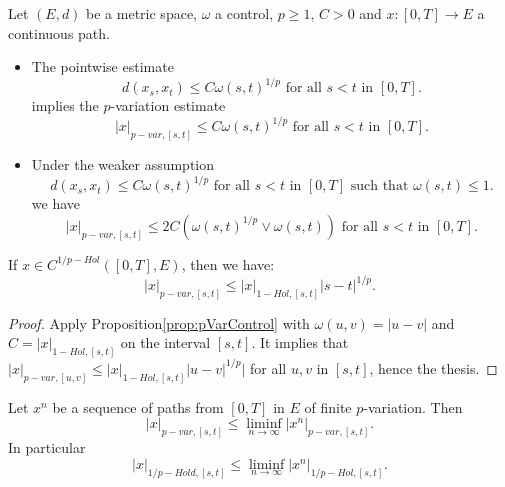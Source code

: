 \begin{proposition}\label{prop:pVarControl}
    Let $(E,d)$ be a metric space, $\omega$ a control, $p \geq 1$, $C>0$ and $x:[0,T] \rightarrow E$ a continuous path.
    \begin{itemize}
        \item The pointwise estimate 
        \begin{equation}
            d(x_s, x_t) \leq C \omega(s,t)^{1/p} \text{ for all } s < t \text{ in } [0,T].
        \end{equation}
        implies the $p$-variation estimate
        \begin{equation}
            |x|_{p-var, [s,t]} \leq C \omega(s,t)^{1/p} \text{ for all } s < t \text{ in } [0,T].
        \end{equation}
        \item Under the weaker assumption 
        \begin{equation}
            d(x_s, x_t) \leq C \omega(s, t)^{1/p} \text{ for all } s < t \text{ in } [0,T] \text{ such that } \omega(s,t) \leq 1.
        \end{equation}
        we have
        \begin{equation}
            |x|_{p-var, [s,t]} \leq 2 C \left( \omega(s,t)^{1/p} \vee \omega(s,t) \right) \text{ for all } s < t \text{ in } [0,T].
        \end{equation}
    \end{itemize}

\end{proposition}

\begin{corollary}\label{lem:pHolderControl}
    If $x \in C^{1/p-Hol}([0,T], E)$, then we have:
    \begin{equation}
        |x|_{p-var, [s,t]} \leq |x|_{1-Hol,[s,t]} |s - t|^{1/p}.
    \end{equation}
\end{corollary}
\begin{proof}
    Apply Proposition\ref{prop:pVarControl} with $\omega(u,v) = |u - v|$ and $C = |x|_{1-Hol,[s,t]}$ on the interval $[s,t]$.
    It implies that $|x|_{p-var, [u,v]} \leq |x|_{1-Hol,[s,t]} |u - v|^{1/p}|$ for all $u, v$ in $[s,t]$, hence the thesis.
\end{proof}

\begin{lemma}
    Let $x^n$ be a sequence of paths from $[0,T]$ in $E$ of finite $p$-variation. Then
    \begin{equation}
        |x|_{p-var,[s,t]} \leq \liminf_{n \rightarrow \infty} |x^n|_{p-var, [s,t]}.
    \end{equation}
    In particular 
    \begin{equation}
        |x|_{1/p-Hold,[s,t]} \leq \liminf_{n \rightarrow \infty} |x^n|_{1/p-Hol, [s,t]}.
    \end{equation}
\end{lemma}

